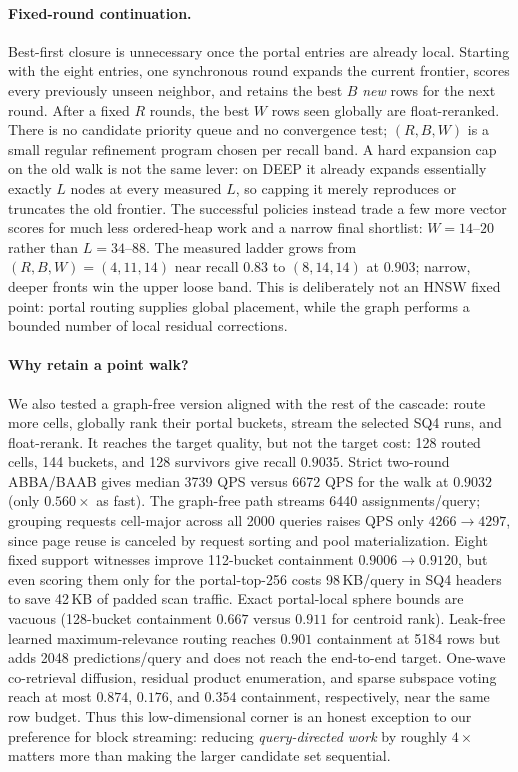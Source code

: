\documentclass{article}
\begin{document}
\paragraph{Fixed-round continuation.} Best-first closure is unnecessary once the
portal entries are already local. Starting with the eight entries, one synchronous
round expands the current frontier, scores every previously unseen neighbor, and
retains the best $B$ \emph{new} rows for the next round. After a fixed $R$ rounds,
the best $W$ rows seen globally are float-reranked. There is no candidate priority
queue and no convergence test; $(R,B,W)$ is a small regular refinement program
chosen per recall band. A hard expansion cap on the old walk is not the same
lever: on DEEP it already expands essentially exactly $L$ nodes at every measured
$L$, so capping it merely reproduces or truncates the old frontier. The successful
policies instead trade a few more vector scores for much less ordered-heap work and
a narrow final shortlist: $W{=}14$--$20$ rather than $L{=}34$--$88$. The measured
ladder grows from $(R,B,W)=(4,11,14)$ near recall $0.83$ to $(8,14,14)$ at
$0.903$; narrow, deeper fronts win the upper loose band. This is deliberately not
an HNSW fixed point: portal routing supplies global placement, while the graph
performs a bounded number of local residual corrections.

\paragraph{Why retain a point walk?} We also tested a graph-free version aligned
with the rest of the cascade: route more cells, globally rank their portal
buckets, stream the selected SQ4 runs, and float-rerank. It reaches the target
quality, but not the target cost: 128 routed cells, 144 buckets, and 128
survivors give recall $0.9035$. Strict two-round ABBA/BAAB gives median
3739 QPS versus 6672 QPS for the walk at $0.9032$ (only $0.560\times$ as
fast). The graph-free path streams 6440 assignments/query; grouping requests
cell-major across all 2000 queries raises QPS only $4266\to4297$, since page
reuse is canceled by request sorting and pool materialization. Eight fixed
support witnesses improve 112-bucket containment $0.9006\to0.9120$, but even
scoring them only for the portal-top-256 costs 98\,KB/query in SQ4 headers to
save 42\,KB of padded scan traffic. Exact portal-local sphere bounds are
vacuous (128-bucket containment $0.667$ versus $0.911$ for centroid rank).
Leak-free learned maximum-relevance routing reaches $0.901$ containment at
5184 rows but adds 2048 predictions/query and does not reach the end-to-end
target. One-wave co-retrieval diffusion, residual product enumeration, and
sparse subspace voting reach at most $0.874$, $0.176$, and $0.354$ containment,
respectively, near the same row budget. Thus this low-dimensional corner is an
honest exception to our preference for block streaming: reducing
\emph{query-directed work} by roughly $4\times$ matters more than making the
larger candidate set sequential.
\end{document}
